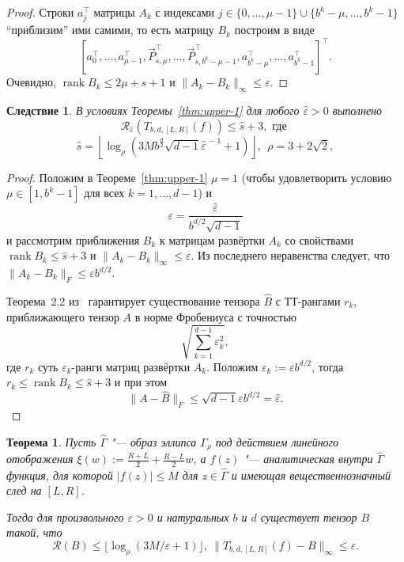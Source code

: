 \documentclass[3p]{cmmp}%
\DeclareMathOperator{\rank}{rank}
\newtheorem{theorem}{Теорема}
\newtheorem{corollary}{Следствие}
\numberwithin{equation}{section}
\begin{document}
\begin{proof}
	Строки $a_j^\top$ матрицы $A_k$ с индексами $j \in \{0, \dots, \mu - 1\}\cup \{b^k - \mu, \dots, b^k - 1\}$ ``приблизим'' ими самими, то есть матрицу $B_k$ построим в виде 
	\[
	\left[a_0^{\top}, \dots, a_{\mu-1}^{\top}, \vec{P}_{s,\mu}^{\top}, \dots, \vec{P}_{s, b^k-\mu-1}^{\top}, a_{b^k-\mu}^{\top}, \dots, a_{b^k-1}^{\top}\right]^{\top}.
	\]
	Очевидно, $\rank B_k \leq 2\mu + s+1$ и $\|A_k - B_k\|_{\infty} \leq \varepsilon$.
\end{proof}
\begin{corollary}\label{cor:upper}
	В условиях Теоремы~\ref{thm:upper-1} для любого $\widehat{\varepsilon} > 0$ выполнено
	\[
	\mathcal{R}_{\widehat\varepsilon}(T_{b,d,[L,R]}(f)) \leq \widehat s + 3, \text{ где }
	\]
	\[
	\widehat s = \left\lfloor \log_{\rho} \left(3Mb^{\frac{d}{2}}\sqrt{d-1}\widehat\varepsilon^{\,-1} +1\right)\right\rfloor,~~\rho = 3+2 \sqrt{2},
	\]
\end{corollary}
\begin{proof}
	Положим в Теореме~\ref{thm:upper-1} $\mu = 1$ (чтобы удовлетворить условию $\mu \in [1, b^k-1]$ для всех $k=1,\dots,d-1$) и
	\[
	\varepsilon = \frac{\widehat\varepsilon}{b^{d/2}\sqrt{d-1}}
	\]
	и рассмотрим приближения $B_k$ к матрицам развёртки $A_k$ со свойствами  $\rank B_k \leq \widehat s+3$ и $\|A_k - B_k\|_{\infty} \leq \varepsilon$. 
	Из последнего неравенства следует, что $\|A_k - B_k\|_F \leq \varepsilon b^{d/2}$.
	
	Теорема~2.2 из~\cite{Oseledets2010} гарантирует существование тензора $\widehat B$ с ТТ-рангами $r_k$, приближающего тензор $A$ в норме Фробениуса с точностью
	\[
	\sqrt{\sum_{k=1}^{d-1} \varepsilon_k^2},
	\]
	где $r_k$ суть $\varepsilon_k$-ранги матриц развёртки $A_k$.
	Положим $\varepsilon_k := \varepsilon b^{d/2}$, тогда $r_k \leq \rank B_k \leq \widehat s + 3$ и при этом
	\[
	\|A - \widehat B\|_F \leq \sqrt{d-1}\varepsilon b^{d/2} = \widehat \varepsilon.
	\]
\end{proof}
\begin{theorem}
	Пусть $\widehat{\Gamma}$ "--- образ эллипса $\Gamma_{\rho}$ под действием линейного отображения $\xi(w) := \frac{R+L}{2}+\frac{R-L}{2}w$, а $f(z)$ "--- аналитическая внутри $\widehat{\Gamma}$ функция, для которой $|f(z)| \leq M$ для $z \in \widehat{\Gamma}$ и имеющая вещественнозначный след на $[L, R]$.
	
	Тогда для произвольного $\varepsilon > 0$ и натуральных $b$ и $d$ существует тензор $B$ такой, что
	\[
	\mathcal{R}(B) \leq \lfloor \log_{\rho} \left(3M/\varepsilon+1\right)\rfloor,~\|T_{b,d,[L,R]}(f) - B\|_{\infty} \leq \varepsilon.
	\]
\end{theorem}
\end{document}
